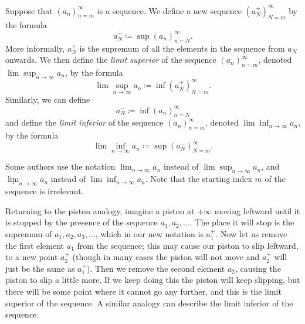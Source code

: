 \begin{definition}\label{6.4.6}
    Suppose that \((a_n)_{n = m}^\infty\) is a sequence.
    We define a new sequence \((a_N^+)_{N = m}^\infty\) by the formula
    \[
        a_N^+ \coloneqq \sup(a_n)_{n = N}^\infty.
    \]
    More informally, \(a_N^+\) is the supremum of all the elements in the sequence from \(a_N\) onwards.
    We then define the \emph{limit superior} of the sequence \((a_n)_{n = m}^\infty\), denoted \(\lim\sup_{n \to \infty} a_n\), by the formula
    \[
        \lim\sup_{n \to \infty} a_n \coloneqq \inf(a_N^+)_{N = m}^\infty.
    \]
    Similarly, we can define
    \[
        a_N^- \coloneqq \inf(a_n)_{n = N}^\infty
    \]
    and define the \emph{limit inferior} of the sequence \((a_n)_{n = m}^\infty\), denoted \(\lim\inf_{n \to \infty} a_n\), by the formula
    \[
        \lim\inf_{n \to \infty} a_n \coloneqq \sup(a_N^-)_{N = m}^\infty.
    \]
\end{definition}

\setcounter{theorem}{10}
\begin{remark}\label{6.4.11}
    Some authors use the notation \(\overline{\lim}_{n \to \infty} a_n\) instead of \(\lim\sup_{n \to \infty} a_n\), and \(\underline{\lim}_{n \to \infty} a_n\) instead of \(\lim\inf_{n \to \infty} a_n\).
    Note that the starting index \(m\) of the sequence is irrelevant.
\end{remark}

\begin{note}
    Returning to the piston analogy, imagine a piston at \(+\infty\) moving leftward until it is stopped by the presence of the sequence \(a_1, a_2, \dots\).
    The place it will stop is the supremum of \(a_1, a_2, a_3, \dots\), which in our new notation is \(a_1^+\).
    Now let us remove the first element \(a_1\) from the sequence;
    this may cause our piston to slip leftward, to a new point \(a_2^+\)
    (though in many cases the piston will not move and \(a_2^+\) will just be the same as \(a_1^+\)).
    Then we remove the second element \(a_2\), causing the piston to slip a little more.
    If we keep doing this the piston will keep slipping, but there will be some point where it cannot go any further, and this is the limit superior of the sequence.
    A similar analogy can describe the limit inferior of the sequence.
\end{note}

